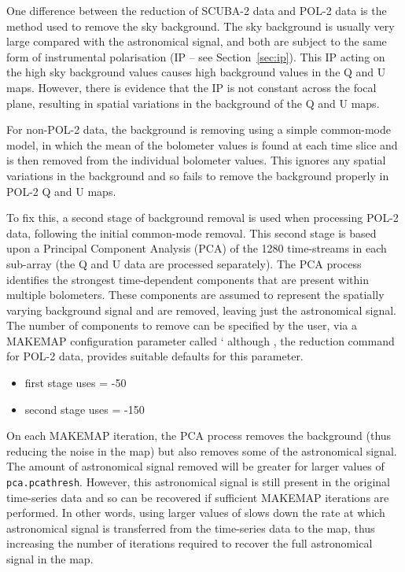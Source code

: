 One difference between the reduction of SCUBA-2 data and POL-2 data is the
method used to remove the sky background.  The sky background is usually
very large compared with the astronomical signal, and both are subject to
the same form of instrumental polarisation (IP -- see Section~\ref{sec:ip}).
This
IP acting on the high sky background values causes high background values
in the Q and U maps. However, there is evidence that the IP is not
constant across the focal plane, resulting in spatial variations in the
background of the Q and U maps.

For non-POL-2 data, the background is removing using a simple common-mode
model, in which the mean of the bolometer values is found at each time
slice and is then removed from the individual bolometer values. This
ignores any spatial variations in the background and so fails to remove
the background properly in POL-2 Q and U maps.

To fix this, a second stage of background removal is used when processing
POL-2 data, following the initial common-mode removal. This second stage
is based upon a Principal Component Analysis (PCA) of the 1280
time-streams in each sub-array (the Q and U data are processed
separately). The PCA process identifies the strongest time-dependent
components that are present within multiple bolometers. These components
are assumed to represent the spatially varying background signal and are
removed, leaving just the astronomical signal. The number of components
to remove can be specified by the user, via a MAKEMAP configuration
parameter called ` although \poltwomap,
the reduction command for POL-2
data, provides suitable defaults for this parameter.

\begin{itemize}
\item first stage uses  = -50
\item second stage uses  = -150
\end{itemize}

On each MAKEMAP iteration, the PCA process removes the background (thus
reducing the noise in the map) but also removes some of the astronomical
signal. The amount of astronomical signal removed will be greater for
larger values of \texttt{pca.pcathresh}. However, this astronomical
signal is still present in the original time-series data and so can be
recovered if sufficient MAKEMAP iterations are performed. In other words,
using larger values of  slows down the rate at
which astronomical signal is transferred from the time-series data to the
map, thus increasing the number of iterations required to recover the
full astronomical signal in the map.

